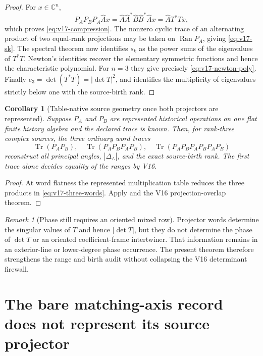 \documentclass[11pt]{article}
\newtheorem{corollary}[corollary]{Corollary}
\theoremstyle{definition}
\theoremstyle{remark}
\newtheorem{remark}[remark]{Remark}
\newcommand{\Tr}{\operatorname{Tr}}
\begin{document}
\begin{proof}
For $x\in\mathbb C^n$,
\[
 P_AP_BP_A\widehat A x
 =\widehat A\widehat A^*\widehat B\widehat B^*\widehat A x
 =\widehat A T^*Tx,
\]
which proves \eqref{eq:v17-compression}.  The nonzero cyclic trace of an
alternating product of two equal-rank projections may be taken on
$\operatorname{Ran} P_A$, giving \eqref{eq:v17-sk}.  The spectral theorem now identifies
$s_k$ as the power sums of the eigenvalues of $T^*T$.  Newton's identities
recover the elementary symmetric functions and hence the characteristic
polynomial.  For $n=3$ they give precisely
\eqref{eq:v17-newton-poly}.  Finally
$e_3=\det(T^*T)=|\det T|^2$, and
 identifies the multiplicity of eigenvalues
strictly below one with the source-birth rank.
\end{proof}

\begin{corollary}[Table-native source geometry once both projectors are represented]
\label{cor:v17-table-native-projectors}
Suppose $P_A$ and $P_B$ are represented historical operations on one flat
finite history algebra and the declared trace is known.  Then, for rank-three
complex sources, the three ordinary word traces
\[
 \boxed{
 \Tr(P_AP_B),
 \quad
 \Tr(P_AP_BP_AP_B),
 \quad
 \Tr(P_AP_BP_AP_BP_AP_B)}
 \tag{V17.9}\label{eq:v17-three-words}
\]
reconstruct all principal angles, $|\Delta_\wedge|$, and the exact source-birth
rank.  The first trace alone decides equality of the ranges by V16.
\end{corollary}

\begin{proof}
At word flatness the represented multiplication table reduces the three
products in \eqref{eq:v17-three-words}.  Apply
 and the V16 projection-overlap theorem.
\end{proof}

\begin{remark}[Phase still requires an oriented mixed row]
Projector words determine the singular values of $T$ and hence
$|\det T|$, but they do not determine the phase of $\det T$ or an oriented
coefficient-frame intertwiner.  That information remains in an exterior-line
or lower-degree phase occurrence.  The present theorem therefore strengthens
the range and birth audit without collapsing the V16 determinant firewall.
\end{remark}

\section{The bare matching-axis record does not represent its source projector}
\label{sec:v17-halfedge-no-projector}
\end{document}
